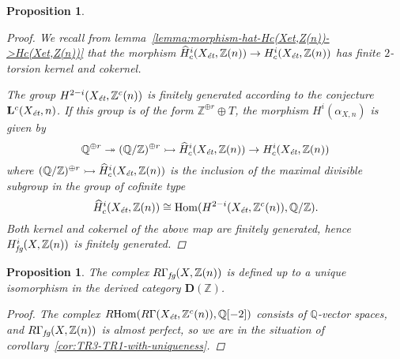 \documentclass[leqno,12pt]{article}
\theoremstyle{plain}
\newtheorem{proposition}[theorem]{\indent\sc Proposition}
\theoremstyle{definition}
\DeclareMathOperator{\Hom}{Hom}
\newcommand{\QQ}{\mathbb{Q}}
\newcommand{\ZZ}{\mathbb{Z}}
\newcommand{\et}{\text{\it \'{e}t}}
\newcommand{\fg}{\text{\it fg}}
\newcommand{\RHom}{R\!\Hom}
\begin{document}
\begin{proposition}
\begin{proof}
    We recall from lemma~\ref{lemma:morphism-hat-Hc(Xet,Z(n))->Hc(Xet,Z(n))}
    that the morphism
    $\widehat{H}^i_c (X_\et, \ZZ (n)) \to H^i_c (X_\et, \ZZ (n))$ has finite
    $2$-torsion kernel and cokernel.

    The group $H^{2-i} (X_\et, \ZZ^c (n))$ is finitely generated
    according to the conjecture $\mathbf{L}^c (X_\et, n)$. If this
    group is of the form $\ZZ^{\oplus r}\oplus T$, the morphism
    $H^i (\alpha_{X,n})$ is given by
    \[ \QQ^{\oplus r} \twoheadrightarrow
      (\QQ/\ZZ)^{\oplus r} \rightarrowtail
      \widehat{H}^i_c (X_\et, \ZZ (n)) \to
      H^i_c (X_\et, \ZZ (n)) \]
    where
    $(\QQ/\ZZ)^{\oplus r} \rightarrowtail \widehat{H}^i_c (X_\et, \ZZ (n))$ is
    the inclusion of the maximal divisible subgroup in the group of cofinite
    type
    $$\widehat{H}^i_c (X_\et, \ZZ (n)) \cong \Hom (H^{2-i} (X_\et, \ZZ^c (n)), \QQ/\ZZ).$$
    Both kernel and cokernel of the above map are finitely generated, hence
    $H^i_\fg (X, \ZZ (n))$ is finitely generated.
  \end{proof}
\end{proposition}

\begin{proposition}
  \label{prop:RGamma-fg-uniquely-defined}
  The complex $R\Gamma_\fg (X, \ZZ (n))$ is defined up to a unique isomorphism
  in the derived category $\mathbf{D} (\ZZ)$.

  \begin{proof}
    The complex $\RHom (R\Gamma (X_\et, \ZZ^c (n)), \QQ [-2])$ consists of
    $\QQ$-vector spaces, and $R\Gamma_\fg (X, \ZZ (n))$ is almost perfect, so we
    are in the situation of corollary~\ref{cor:TR3-TR1-with-uniqueness}.
  \end{proof}
\end{proposition}
\end{document}
